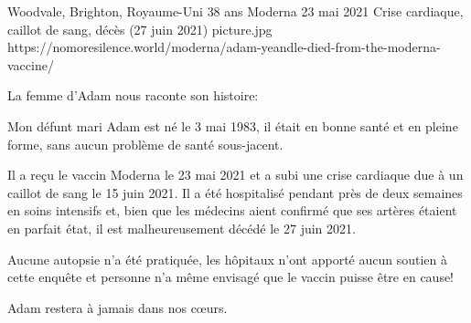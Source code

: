 {Woodvale, Brighton, Royaume-Uni}
{38 ans}
{Moderna}
{23 mai 2021}
{Crise cardiaque, caillot de sang, décès (27 juin 2021)}
{picture.jpg}
{https://nomoresilence.world/moderna/adam-yeandle-died-from-the-moderna-vaccine/}
{

La femme d'Adam nous raconte son histoire:

Mon défunt mari Adam est né le 3 mai 1983, il était en bonne santé et en pleine
forme, sans aucun problème de santé sous-jacent.

Il a reçu le vaccin Moderna le 23 mai 2021 et a subi une crise cardiaque due à
un caillot de sang le 15 juin 2021. Il a été hospitalisé pendant près de deux
semaines en soins intensifs et, bien que les médecins aient confirmé que ses
artères étaient en parfait état, il est malheureusement décédé le 27 juin 2021.

Aucune autopsie n'a été pratiquée, les hôpitaux n'ont apporté aucun soutien à
cette enquête et personne n'a même envisagé que le vaccin puisse être en cause!

Adam restera à jamais dans nos cœurs.

}
